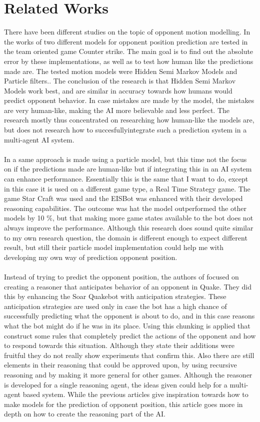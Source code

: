 \documentclass[a4paper, 12pt]{article}
\begin{document}
\section{Related Works}
There have been different studies on the topic of opponent motion modelling.
In the works of \citep{Hladky_anevaluation} two different models for opponent
position prediction are tested in the team oriented game Counter strike. The
main goal is to find out the absolute error by these implementations, as well as
to test how human like the predictions made are. The tested motion models were
Hidden Semi Markov Models and Particle filters.. The conclusion of the research
is that Hidden Semi Markov Models work best, and are similar in accuracy towards
how humans would predict opponent behavior. In case mistakes are made by the
model, the mistakes are very human-like, making the AI more believable and less
perfect. The research mostly thus concentrated on researching how human-like the
models are, but does not research how to succesfullyintegrate such a prediction system in a multi-agent AI system.
\\\\
In \citep{weber2011aiide} a same approach is made using a particle model, but this time not the focus on if the predictions made are human-like but if integrating this in an AI system can enhance performance. Essentially this is the same that I want to do, except in this case it is used on a different game type, a Real Time Strategy game. The game Star Craft was used and the EISBot was enhanced with their developed reasoning capabilities. The outcome was hat the model outperformed the other models by 10 \%, but that making more game states available to the bot does not always improve the performance. Although this research does sound quite similar to my own research question, the domain is different enough to expect different result, but still their particle model implementation could help me with developing my own way of prediction opponent position.
\\\\
Instead of trying to predict the opponent position, the authors of \citep{Laird:2001:KYG:375735.376343} focused on creating a reasoner that anticipates behavior of an opponent in Quake. They did this by enhancing the Soar Quakebot with anticipation strategies. These anticipation strategies are used only in case the bot has a high chance of successfully predicting what the opponent is about to do, and in this case reasons what the bot might do if he was in its place. Using this chunking is applied that construct some rules that completely predict the actions of the opponent and how to respond towards this situation. Although they state their additions were fruitful they do not really show experiments that confirm this. Also there are still elements in their reasoning that could be approved upon, by using recursive reasoning and by making it more general for other games. Although the reasoner is developed for a single reasoning agent, the ideas given could help for a multi-agent based system. While the previous articles give inspiration towards how to make models for the prediction of opponent position, this article goes more in depth on how to create the reasoning part of the AI. 
\end{document}
